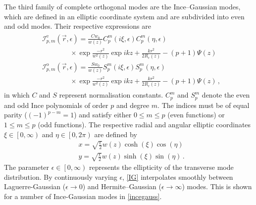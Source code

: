 \documentclass[../Thesis-IJspeert.tex]{subfiles}
\begin{document}
The third family of complete orthogonal modes are the Ince–Gaussian modes, which are defined in an elliptic coordinate system and are subdivided into even and odd modes. Their respective expressions are
\begin{align}
\label{IG}
\begin{split}
&\mathcal{I}_{p,m}^{\mathrm{e}}(\vec{r}, \epsilon) = \frac{C w_0}{w(z)} C_p^m(i \xi, \epsilon) C_p^m(\eta, \epsilon)  \\
&\hspace{4em} \times \exp{\frac{-r^2}{w^2(z)}}\exp{i k z + \frac{k r^2}{2R_\mathrm{c}(z)} - (p + 1) \Psi(z)} \\ &\mathcal{I}_{p,m}^{\mathrm{o}}(\vec{r}, \epsilon) = \frac{S w_0}{w(z)} S_p^m(i \xi, \epsilon) S_p^m(\eta, \epsilon)  \\
&\hspace{4em} \times \exp{\frac{-r^2}{w^2(z)}}\exp{i k z + \frac{k r^2}{2R_\mathrm{c}(z)} - (p + 1) \Psi(z)}
\,,
\end{split}
\end{align}
in which $C$ and $S$ represent normalisation constants. $C_p^m$ and $S_p^m$ denote the even and odd Ince polynomials of order $p$ and degree $m$. The indices must be of equal parity ($(-1)^{p-m}=1$) and satisfy either $0 \leq m \leq p$ (even functions) or $1 \leq m \leq p$ (odd functions). The respective radial and angular elliptic coordinates $\xi\in \left[0,\infty \right)$ and $\eta\in\left[0,2\pi\right)$ are defined by
\begin{align}
&x = \sqrt{\frac{\epsilon}{2}} w(z) \cosh(\xi)\cos(\eta)\\
&y = \sqrt{\frac{\epsilon}{2}} w(z) \sinh(\xi)\sin(\eta)\,.
\end{align}
The parameter $\epsilon\in\left[0,\infty \right)$ represents the ellipticity of the transverse mode distribution. By continuously varying $\epsilon$, \autoref{IG} interpolates smoothly between Laguerre-Gaussian ($\epsilon\rightarrow 0$) and Hermite–Gaussian ($\epsilon\rightarrow \infty$) modes. This is shown for a number of Ince-Gaussian modes in \autoref{incegauss}.
\iffalse
In the former limit, the mode indices are related as follows \cite{Bandres2004}: $m = l$ and $p = 2n + l$. In the latter case, $n_x = m$ and $n_y = p - m$ for the even Ince-Gaussian modes, in contrast to $n_x = m - 1$ and
$n_y = p - m + 1$ for the odd modes.
\fi
\end{document}
